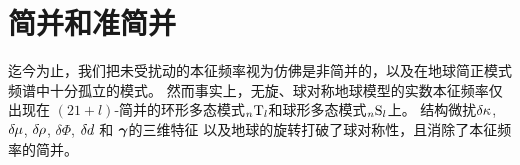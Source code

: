 {{%
\section{简并和准简并}
%
%
%
%
%
%
\label{13.sec.couple}

迄今为止，我们把未受扰动的本征频率视为仿佛是非简并的，以及在地球简正模式频谱中十分孤立的模式。 
然而事实上，无旋、球对称地球模型的实数本征频率仅出现在
$(21+l)$-简并的环形多态模式${}_n{\rm T}_l$和球形多态模式${}_n{\rm S}_l$上。
结构微扰$\delta\hspace{-0.1 mm}\kappa$, $\delta\hspace{-0.2 mm}\mu$,
$\delta\hspace{-0.2 mm}\rho$, $\delta\Phi$, $\delta\hspace{-0.1 mm}d$
和 $\mbox{\boldmath $\bf \gamma$}$的三维特征
以及地球的旋转打破了球对称性，且消除了本征频率的简并。
}}
